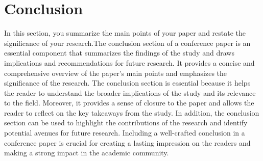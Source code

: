 \documentclass{IEEEtran}
\begin{document}
\section{Conclusion}
In this section, you summarize the main points of your paper and restate the significance of your research.The conclusion section of a conference paper is an essential component that summarizes the findings of the study and draws implications and recommendations for future research. It provides a concise and comprehensive overview of the paper's main points and emphasizes the significance of the research. The conclusion section is essential because it helps the reader to understand the broader implications of the study and its relevance to the field. Moreover, it provides a sense of closure to the paper and allows the reader to reflect on the key takeaways from the study. In addition, the conclusion section can be used to highlight the contributions of the research and identify potential avenues for future research. Including a well-crafted conclusion in a conference paper is crucial for creating a lasting impression on the readers and making a strong impact in the academic community.



\end{document}

